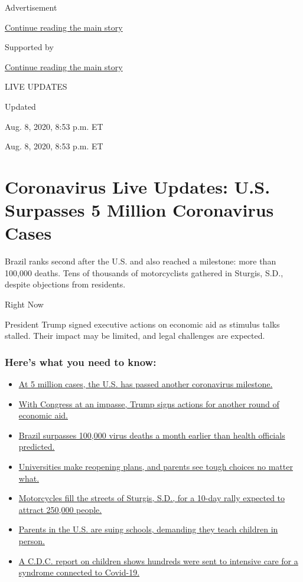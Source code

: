 Advertisement

\protect\hyperlink{after-top}{Continue reading the main story}

Supported by

\protect\hyperlink{after-sponsor}{Continue reading the main story}

LIVE UPDATES

Updated~

Aug. 8, 2020, 8:53 p.m. ET

Aug. 8, 2020, 8:53 p.m. ET

\hypertarget{coronavirus-live-updates-us-surpasses-5-million-coronavirus-cases}{%
\section{Coronavirus Live Updates: U.S. Surpasses 5 Million Coronavirus
Cases}\label{coronavirus-live-updates-us-surpasses-5-million-coronavirus-cases}}

Brazil ranks second after the U.S. and also reached a milestone: more
than 100,000 deaths. Tens of thousands of motorcyclists gathered in
Sturgis, S.D., despite objections from residents.

Right Now

President Trump signed executive actions on economic aid as stimulus
talks stalled. Their impact may be limited, and legal challenges are
expected.

\hypertarget{heres-what-you-need-to-know}{%
\subsubsection{Here's what you need to
know:}\label{heres-what-you-need-to-know}}

\begin{itemize}
\tightlist
\item
  \protect\hyperlink{link-697eb3e1}{At 5 million cases, the U.S. has
  passed another coronavirus milestone.}
\item
  \protect\hyperlink{link-5b7b4fa2}{With Congress at an impasse, Trump
  signs actions for another round of economic aid.}
\item
  \protect\hyperlink{link-680eccee}{Brazil surpasses 100,000 virus
  deaths a month earlier than health officials predicted.}
\item
  \protect\hyperlink{link-7bd2f2ea}{Universities make reopening plans,
  and parents see tough choices no matter what.}
\item
  \protect\hyperlink{link-6d42ce45}{Motorcycles fill the streets of
  Sturgis, S.D., for a 10-day rally expected to attract 250,000 people.}
\item
  \protect\hyperlink{link-458f8def}{Parents in the U.S. are suing
  schools, demanding they teach children in person.}
\item
  \protect\hyperlink{link-57c61e05}{A C.D.C. report on children shows
  hundreds were sent to intensive care for a syndrome connected to
  Covid-19.}
\end{itemize}

